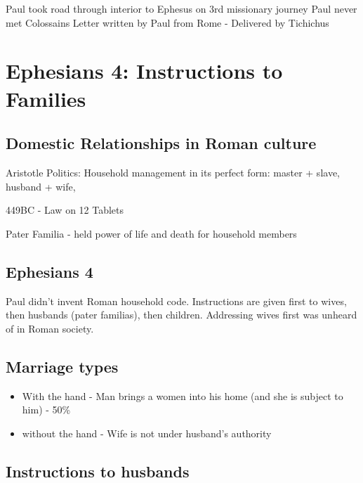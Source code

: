 \documentclass[
]{book}
\providecommand{\tightlist}{%
  \setlength{\itemsep}{0pt}\setlength{\parskip}{0pt}}
\begin{document}
Paul took road through interior to Ephesus on 3rd missionary journey
Paul never met Colossains
Letter written by Paul from Rome - Delivered by Tichichus

\hypertarget{ephesians-4-instructions-to-families}{%
\section{Ephesians 4: Instructions to Families}\label{ephesians-4-instructions-to-families}}

\hypertarget{domestic-relationships-in-roman-culture}{%
\subsection{Domestic Relationships in Roman culture}\label{domestic-relationships-in-roman-culture}}

Aristotle Politics: Household management in its perfect form: master + slave, husband + wife,

449BC - Law on 12 Tablets

Pater Familia - held power of life and death for household members

\hypertarget{ephesians-4}{%
\subsection{Ephesians 4}\label{ephesians-4}}

Paul didn't invent Roman household code. Instructions are given first to wives, then husbands (pater familias), then children. Addressing wives first was unheard of in Roman society.

\hypertarget{marriage-types}{%
\subsection{Marriage types}\label{marriage-types}}

\begin{itemize}
\tightlist
\item
  With the hand - Man brings a women into his home (and she is subject to him) - 50\%
\item
  without the hand - Wife is not under husband's authority
\end{itemize}

\hypertarget{instructions-to-husbands}{%
\subsection{Instructions to husbands}\label{instructions-to-husbands}}
\end{document}
